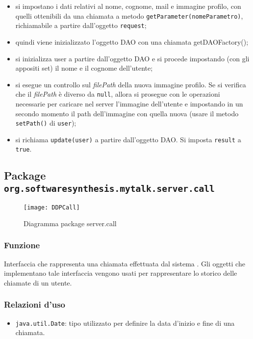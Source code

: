 \begin{description}
\begin{itemize}
	\item si impostano i dati relativi al nome, cognome, mail e immagine profilo, con quelli ottenibili da una chiamata a metodo \texttt{getParameter(nomeParametro)}, richiamabile a partire dall'oggetto \texttt{request};
	\item quindi viene inizializzato l'oggetto DAO con una chiamata getDAOFactory();
	\item si inizializza user a partire dall'oggetto DAO e si procede impostando (con gli appositi set) il nome e il cognome dell'utente;
	\item si esegue un controllo sul \textit{filePath} della nuova immagine profilo. Se si verifica che il \textit{filePath} è diverso da \texttt{null}, allora si prosegue con le operazioni necessarie per caricare nel server l'immagine dell'utente e impostando in un secondo momento il path dell'immagine con quella nuova (usare il metodo \texttt{setPath()} di \texttt{user});
	\item si richiama \texttt{update(user)} a partire dall'oggetto DAO. Si imposta \texttt{result} a \texttt{true}.
\end{itemize}
	
\end{description}


\subsection{Package \texttt{org.softwaresynthesis.mytalk.server.call}}\label{sec:call}

\begin{center}
\begin{figure}[H]
  \texttt{[image: DDPCall]}
\caption{Diagramma package server.call}
\end{figure}
\end{center}


\subsubsection*{Funzione}
Interfaccia che rappresenta una chiamata effettuata dal sistema \caName. Gli oggetti che implementano tale interfaccia vengono usati per rappresentare lo storico delle chiamate di un utente.

\subsubsection*{Relazioni d'uso}
\begin{itemize}
	\item \texttt{java.util.Date}: tipo utilizzato per definire la data d'inizio e fine di una chiamata.
\end{itemize}

